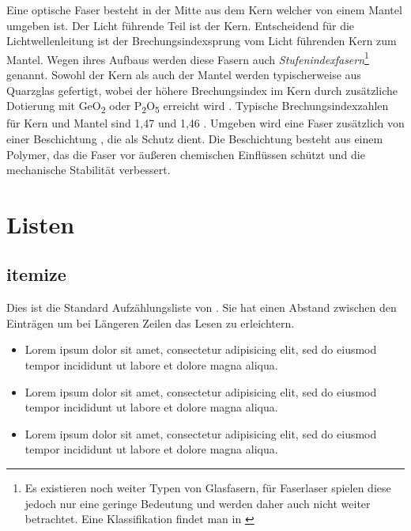 Eine optische Faser besteht in der Mitte aus dem Kern  welcher von einem Mantel  umgeben ist. Der Licht führende Teil ist der Kern. Entscheidend für die Lichtwellenleitung ist der Brechungsindexsprung vom Licht führenden Kern zum Mantel.
Wegen ihres Aufbaus werden diese Fasern auch \emph{Stufenindexfasern}\footnote{Es existieren noch weiter Typen  von Glasfasern, für Faserlaser spielen diese jedoch nur eine geringe Bedeutung und werden daher auch nicht weiter betrachtet. Eine Klassifikation findet man in \cite{parr2007}} genannt.
Sowohl der Kern als auch der Mantel werden typischerweise aus Quarzglas gefertigt, wobei der höhere Brechungsindex im Kern durch zusätzliche Dotierung mit GeO\textsubscript{2} oder P\textsubscript{2}O\textsubscript{5} erreicht wird \cite{aho2007compilers}.
Typische Brechungsindexzahlen für Kern und Mantel sind 1,47 und 1,46 \cite{grune2008parsing}.
Umgeben wird eine Faser zusätzlich von einer Beschichtung , die als Schutz dient.
Die Beschichtung besteht aus einem Polymer, das die Faser vor äußeren chemischen Einflüssen schützt und die mechanische Stabilität verbessert.


\section{Listen}

\subsection{itemize}
Dies ist die Standard Aufzählungsliste von \LaTeXe. Sie hat einen Abstand zwischen den Einträgen um bei Längeren Zeilen das Lesen zu erleichtern.

\begin{itemize}
   \item Lorem ipsum dolor sit amet, consectetur adipisicing elit, sed do eiusmod tempor incididunt ut labore et dolore magna aliqua.
%
   \item Lorem ipsum dolor sit amet, consectetur adipisicing elit, sed do eiusmod tempor incididunt ut labore et dolore magna aliqua.
%
   \item Lorem ipsum dolor sit amet, consectetur adipisicing elit, sed do eiusmod tempor incididunt ut labore et dolore magna aliqua.
\end{itemize}

